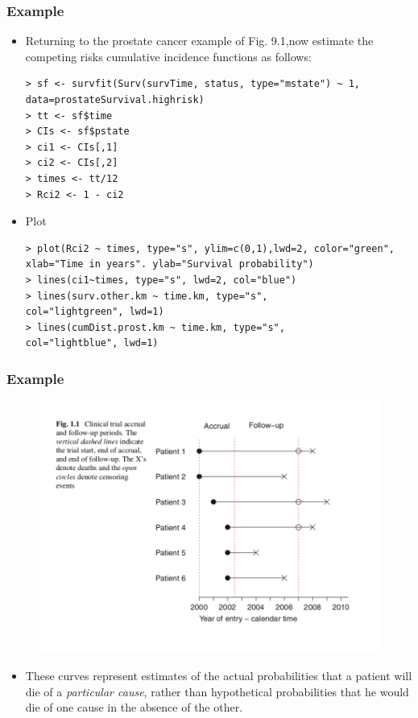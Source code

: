 \documentclass{beamer}
\newcommand{\empr}[1]{{\emph{\color{red}#1}}}
\begin{document}
\pagebreak
\begin{frame}[fragile]
\frametitle{Example}
\begin{itemize}
\item Returning to the prostate cancer example of Fig. 9.1,now estimate the competing risks cumulative incidence functions as follows:
\begin{Verbatim}
> sf <- survfit(Surv(survTime, status, type="mstate") ~ 1,
data=prostateSurvival.highrisk)
> tt <- sf$time
> CIs <- sf$pstate 
> ci1 <- CIs[,1] 
> ci2 <- CIs[,2] 
> times <- tt/12 
> Rci2 <- 1 - ci2
\end{Verbatim}     
\item Plot                  
\begin{Verbatim}
> plot(Rci2 ~ times, type="s", ylim=c(0,1),lwd=2, color="green",
xlab="Time in years". ylab="Survival probability")
> lines(ci1~times, type="s", lwd=2, col="blue")
> lines(surv.other.km ~ time.km, type="s",
col="lightgreen", lwd=1)
> lines(cumDist.prost.km ~ time.km, type="s",
col="lightblue", lwd=1)
\end{Verbatim} 
\end{itemize}
\end{frame}


\pagebreak
\begin{frame}
\frametitle{Example}
\begin{figure}[h!]
\includegraphics[scale = .5]{003.png}
\end{figure}
\begin{itemize}
\item These curves represent estimates of the actual probabilities that a patient will die of a \empr{particular cause}, rather than hypothetical probabilities that he would die of one cause in the absence of the other.                 
\end{itemize}
\end{frame}
\end{document}
